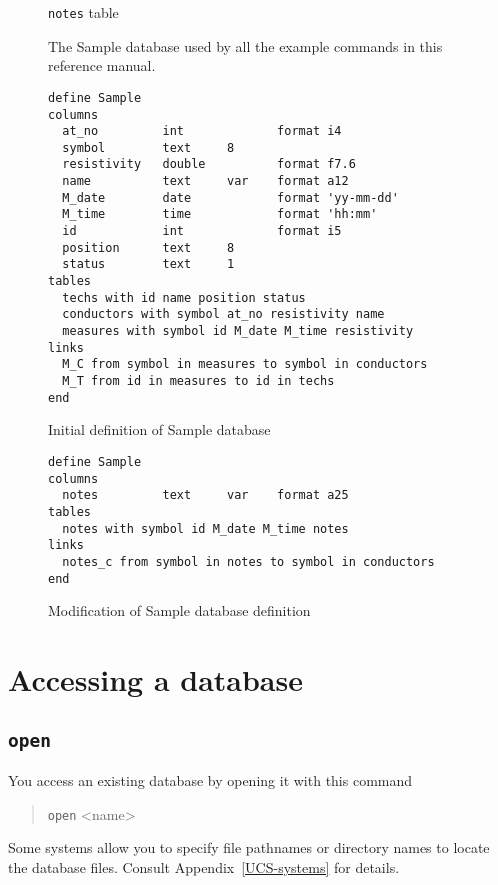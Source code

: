 \documentclass[11pt,a4paper]{report}
\def\I{\index}
\begin{document}
\begin{figure}[htp]
\begin{center}
  \smallskip
          {\verb!notes! table }
\end{center}
\caption[The Sample database]
  {The Sample database used by all the example commands
   in this reference manual.}
\label{Sample}
\end{figure}
 
 
 
\begin{figure}[htp]
\begin{verbatim}
define Sample
columns
  at_no         int             format i4
  symbol        text     8
  resistivity   double          format f7.6
  name          text     var    format a12
  M_date        date            format 'yy-mm-dd'
  M_time        time            format 'hh:mm'
  id            int             format i5
  position      text     8
  status        text     1
tables
  techs with id name position status
  conductors with symbol at_no resistivity name
  measures with symbol id M_date M_time resistivity
links
  M_C from symbol in measures to symbol in conductors
  M_T from id in measures to id in techs
end
\end{verbatim}
\caption{Initial definition of Sample database}
\label{Sample-def1}
\end{figure}
 
 
\begin{figure}[htp]
\begin{verbatim}
define Sample
columns
  notes         text     var    format a25
tables
  notes with symbol id M_date M_time notes
links
  notes_c from symbol in notes to symbol in conductors
end
\end{verbatim}
\caption{Modification of Sample database definition}
\label{Sample-def2}
\end{figure}
 
\section{Accessing a database}
%
\I{open@"open"}
\subsection{{\tt open}}
You access an existing database by opening it with this command
\begin{verse}
\verb|open| <name>
\end{verse}
Some systems allow you to specify file pathnames or
directory names to locate the database files.
Consult Appendix~\ref{UCS-systems} for details.
 
\end{document}
